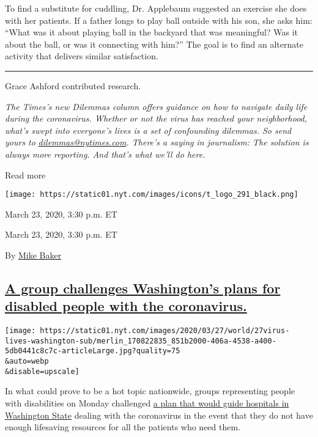 To find a substitute for cuddling, Dr. Applebaum suggested an exercise
she does with her patients. If a father longs to play ball outside with
his son, she asks him: ``What was it about playing ball in the backyard
that was meaningful? Was it about the ball, or was it connecting with
him?'' The goal is to find an alternate activity that delivers similar
satisfaction.

\begin{center}\rule{0.5\linewidth}{\linethickness}\end{center}

Grace Ashford contributed research.

\emph{The Times's new Dilemmas column offers guidance on how to navigate
daily life during the coronavirus. Whether or not the virus has reached
your neighborhood, what's swept into everyone's lives is a set of
confounding dilemmas. So send yours to}
\href{mailto:dilemmas@nytimes.com}{\emph{dilemmas@nytimes.com}}\emph{.
There's a saying in journalism: The solution is always more reporting.
And that's what we'll do here.}

Read more

\texttt{[image: https://static01.nyt.com/images/icons/t\_logo\_291\_black.png]}

March 23, 2020, 3:30 p.m. ET

March 23, 2020, 3:30 p.m. ET

By \href{https://www.nytimes.com/by/mike-baker}{Mike Baker}

\hypertarget{a-group-challenges-washingtons-plans-for-disabled-people-with-the-coronavirus}{%
\subsection{\texorpdfstring{\protect\hyperlink{a-group-challenges-washingtons-plans-for-disabled-people-with-the-coronavirus}{A
group challenges Washington's plans for disabled people with the
coronavirus.}}{A group challenges Washington's plans for disabled people with the coronavirus.}}\label{a-group-challenges-washingtons-plans-for-disabled-people-with-the-coronavirus}}

\texttt{[image: https://static01.nyt.com/images/2020/03/27/world/27virus-lives-washington-sub/merlin\_170822835\_851b2000-406a-4538-a400-5db0441c8c7c-articleLarge.jpg?quality=75\\\&auto=webp\\\&disable=upscale]}

In what could prove to be a hot topic nationwide, groups representing
people with disabilities on Monday challenged
\href{https://www.nytimes.com/2020/03/20/us/coronavirus-in-seattle-washington-state.html}{a
plan that would guide hospitals in Washington State} dealing with the
coronavirus in the event that they do not have enough lifesaving
resources for all the patients who need them.

